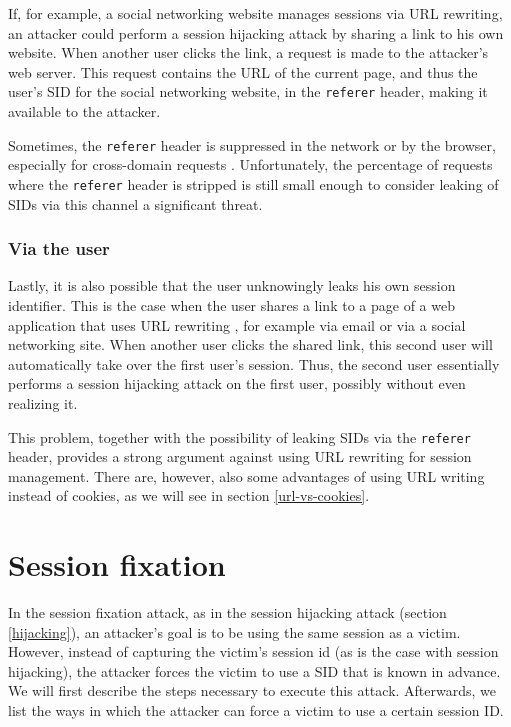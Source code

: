 If, for example, a social networking website manages sessions via URL rewriting, an attacker could perform a session hijacking attack by sharing a link to his own website. When another user clicks the link, a request is made to the attacker's web server. This request contains the URL of the current page, and thus the user's SID for the social networking website, in the \texttt{referer} header, making it available to the attacker.

Sometimes, the \texttt{referer} header is suppressed in the network or by the browser, especially for cross-domain requests \cite{Barth2008}. Unfortunately, the percentage of requests where the \texttt{referer} header is stripped is still small enough to consider leaking of SIDs via this channel a significant threat.

\subsubsection{Via the user}

Lastly, it is also possible that the user unknowingly leaks his own session identifier. This is the case when the user shares a link to a page of a web application that uses URL rewriting \cite{Johnston2004}, for example via email or via a social networking site. When another user clicks the shared link, this second user will automatically take over the first user's session. Thus, the second user essentially performs a session hijacking attack on the first user, possibly without even realizing it.

This problem, together with the possibility of leaking SIDs via the \texttt{referer} header, provides a strong argument against using URL rewriting for session management. There are, however, also some advantages of using URL writing instead of cookies, as we will see in section \ref{url-vs-cookies}.

\section{Session fixation}\label{fixation}

In the session fixation attack, as in the \gls{session hijacking} attack (section \ref{hijacking}), an attacker's goal is to be using the same session as a victim. However, instead of capturing the victim's \gls{session id} (as is the case with session hijacking), the attacker forces the victim to use a SID that is known in advance. We will first describe the steps necessary to execute this attack. Afterwards, we list the ways in which the attacker can force a victim to use a certain session ID.

